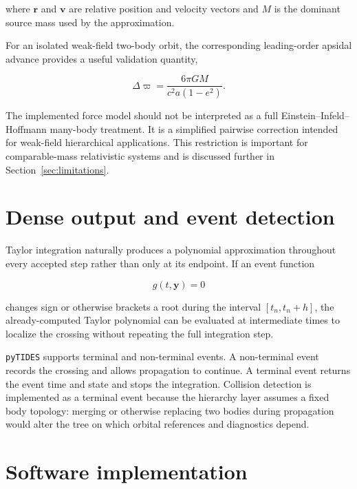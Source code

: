 \documentclass[11pt]{article}
\begin{document}
where $\bm r$ and $\bm v$ are relative position and velocity vectors and
$M$ is the dominant source mass used by the approximation.

For an isolated weak-field two-body orbit, the corresponding leading-order
apsidal advance provides a useful validation quantity,

\begin{equation}
    \Delta\varpi
    =
    \frac{6\pi G M}
    {c^2a(1-e^2)}.
    \label{eq:gr-precession}
\end{equation}

The implemented force model should not be interpreted as a full
Einstein--Infeld--Hoffmann many-body treatment. It is a simplified pairwise
correction intended for weak-field hierarchical applications. This
restriction is important for comparable-mass relativistic systems and is
discussed further in Section~\ref{sec:limitations}.


\section{Dense output and event detection}
\label{sec:events}

Taylor integration naturally produces a polynomial approximation throughout
every accepted step rather than only at its endpoint. If an event function

\begin{equation}
    g(t,\bm y)=0
\end{equation}

changes sign or otherwise brackets a root during the interval
$[t_n,t_n+h]$, the already-computed Taylor polynomial can be evaluated at
intermediate times to localize the crossing without repeating the full
integration step.

\texttt{pyTIDES} supports terminal and non-terminal events. A non-terminal
event records the crossing and allows propagation to continue. A terminal
event returns the event time and state and stops the integration. Collision
detection is implemented as a terminal event because the hierarchy layer
assumes a fixed body topology: merging or otherwise replacing two bodies
during propagation would alter the tree on which orbital references and
diagnostics depend.


\section{Software implementation}
\label{sec:implementation}
\end{document}
